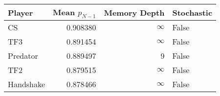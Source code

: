 \begin{tabular}{lrrl}
\toprule
    Player &  Mean $p_{N-1}$ &  Memory Depth & Stochastic \\
\midrule
        CS &        0.908380 &            \(\infty\) &      False \\
       TF3 &        0.891454 &            \(\infty\) &      False \\
  Predator &        0.889497 &             9 &      False \\
       TF2 &        0.879515 &            \(\infty\) &      False \\
 Handshake &        0.878466 &            \(\infty\) &      False \\
\bottomrule
\end{tabular}
